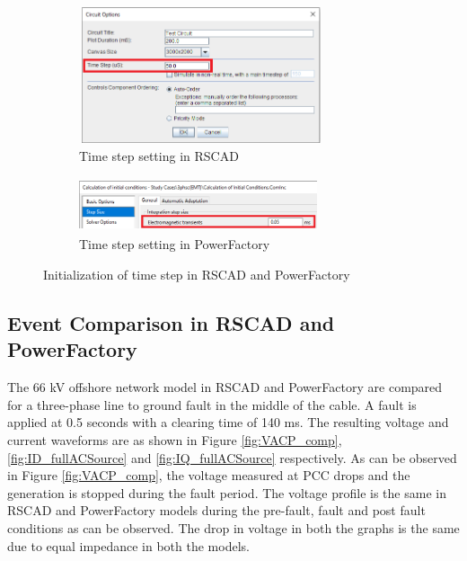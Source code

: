 \begin{figure}[H]
\centering
\begin{subfigure}{.55\textwidth}
  \centering
  \includegraphics[height=4cm,width=7.2cm]{Diagrams/Chapter_3/Stepsize_RSCAD.PNG}
  \caption{Time step setting in RSCAD}
  \label{Stepsize_RSCAD}
\end{subfigure}%
\begin{subfigure}{.45\textwidth}
  \centering
  \includegraphics[height=1.6cm,width=7cm]{Diagrams/Chapter_3/Stepsize_PFD_Zoom.PNG}
  \caption{Time step setting in PowerFactory}
  \label{Stepsize_PFD_Zoom}
\end{subfigure}
\caption{Initialization of time step in RSCAD and PowerFactory}
\label{fig:Stepsize_RSCAD_PFD}
\end{figure}

\subsection{Event Comparison in RSCAD and PowerFactory}
The 66 kV offshore network model in RSCAD and PowerFactory are compared for a three-phase line to ground fault in the middle of the cable. A fault is applied at 0.5 seconds with a clearing time of 140 ms. The resulting voltage and current waveforms are as shown in Figure \ref{fig:VACP_comp},  \ref{fig:ID_fullACSource} and \ref{fig:IQ_fullACSource} respectively. As can be observed in Figure \ref{fig:VACP_comp}, the voltage measured at \gls{PCC} drops and the generation is stopped during the fault period. The voltage profile is the same in RSCAD and PowerFactory models during the pre-fault, fault and post fault conditions as can be observed. The drop in voltage in both the graphs is the same due to equal impedance in both the models. 

